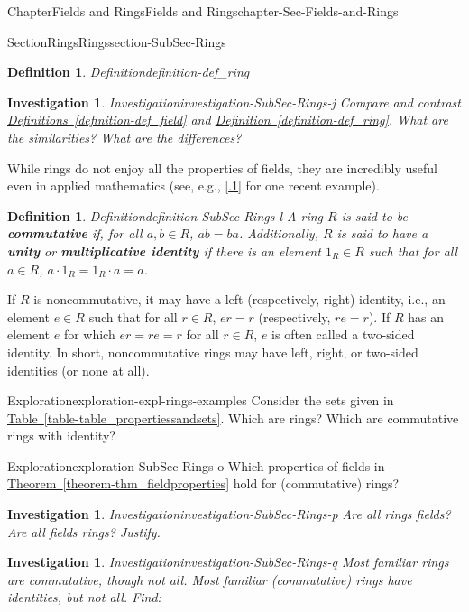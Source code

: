 \documentclass[oneside,10pt,]{book}
\newcommand{\xreffont}{\relax}
\newcommand{\terminology}[1]{\textbf{#1}}
\numberwithin{equation}{section}
\newtheorem{definition}[theorem]{Definition}
\newtheorem{investigation}[theorem]{Investigation}
\begin{document}
\begin{chapterptx}{Chapter}{Fields and Rings}{}{Fields and Rings}{}{}{chapter-Sec-Fields-and-Rings}
\begin{sectionptx}{Section}{Rings}{}{Rings}{}{}{section-SubSec-Rings}
\begin{definition}{Definition}{}{definition-def_ring}
\end{definition}
\begin{investigation}{Investigation}{}{investigation-SubSec-Rings-j}%
Compare and contrast \hyperref[definition-def_field]{Definitions~{\xreffont\ref{definition-def_field}}} and \hyperref[definition-def_ring]{Definition~{\xreffont\ref{definition-def_ring}}}. What are the similarities? What are the differences?%
\end{investigation}%
While rings do not enjoy all the properties of fields, they are incredibly useful even in applied mathematics (see, e.g., \hyperlink{biblio-Curto2013}{[{\xreffont 2.2.1}]} for one recent example).%
\begin{definition}{Definition}{}{definition-SubSec-Rings-l}%
%
%
%
A ring \(R\) is said to be \terminology{commutative} if, for all \(a,b\in R\), \(ab = ba\). Additionally, \(R\) is said to have a \terminology{unity} or \terminology{multiplicative identity} if there is an element \(1_R\in R\) such that for all \(a\in R\), \(a \cdot 1_R = 1_R \cdot a= a\).%
\end{definition}
If \(R\) is noncommutative, it may have a left (respectively, right) identity, i.e., an element \(e\in R\) such that for all \(r\in R\), \(er = r\) (respectively, \(re = r\)). If \(R\) has an element \(e\) for which \(er = re = r\) for all \(r\in R\), \(e\) is often called a two-sided identity. In short, noncommutative rings may have left, right, or two-sided identities (or none at all).%
\begin{exploration}{Exploration}{}{exploration-expl-rings-examples}%
Consider the sets given in \hyperref[table-table_propertiessandsets]{Table~{\xreffont\ref{table-table_propertiessandsets}}}. Which are rings? Which are commutative rings with identity?%
\end{exploration}%
\begin{exploration}{Exploration}{}{exploration-SubSec-Rings-o}%
Which properties of fields in \hyperref[theorem-thm_fieldproperties]{Theorem~{\xreffont\ref{theorem-thm_fieldproperties}}} hold for (commutative) rings?%
\end{exploration}%
\begin{investigation}{Investigation}{}{investigation-SubSec-Rings-p}%
Are all rings fields? Are all fields rings? Justify.%
\end{investigation}%
\begin{investigation}{Investigation}{}{investigation-SubSec-Rings-q}%
Most familiar rings are commutative, though not all. Most familiar (commutative) rings have identities, but not all. Find:%

\end{investigation}
\end{sectionptx}
\end{chapterptx}
\end{document}
